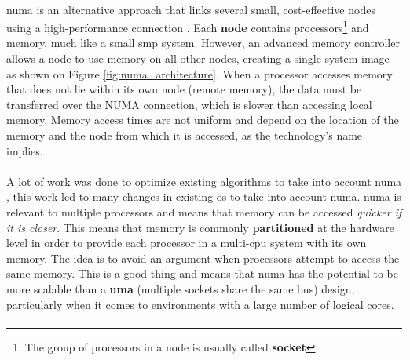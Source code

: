 \paragraph{} \acrshort{numa} is an alternative approach that links several small, cost-effective nodes using a high-performance connection \citep{vttools2}. Each \textbf{node} contains processors\footnote{The group of processors in a node is usually called \textbf{socket}} and memory, much like a small \acrshort{smp} system. However, an advanced memory controller allows a node to use memory on all other nodes, creating a single system image as shown on Figure \ref{fig:numa_architecture}. When a processor accesses memory that does not lie within its own node (remote memory), the data must be transferred over the NUMA connection, which is slower than accessing local memory. Memory access times are not uniform and depend on the location of the memory and the node from which it is accessed, as the technology's name implies. 

\paragraph{} A lot of work was done to optimize existing algorithms to take into account \acrshort{numa} \citep{numa01,numa02,numa03}, this work led to many changes in existing \acrshort{os} to take into account \acrshort{numa}. \acrshort{numa} is relevant to multiple processors and means that memory can be accessed \textit{quicker if it is closer}. This means that memory is commonly \textbf{partitioned} at the hardware level in order to provide each processor in a multi-\acrshort{cpu} system with its own memory. The idea is to avoid an argument when processors attempt to access the same memory. This is a good thing and means that \acrshort{numa} has the potential to be more scalable than a \textbf{\acrshort{uma}} (multiple sockets share the same bus) design, particularly when it comes to environments with a large number of logical cores. 

\paragraph{}

